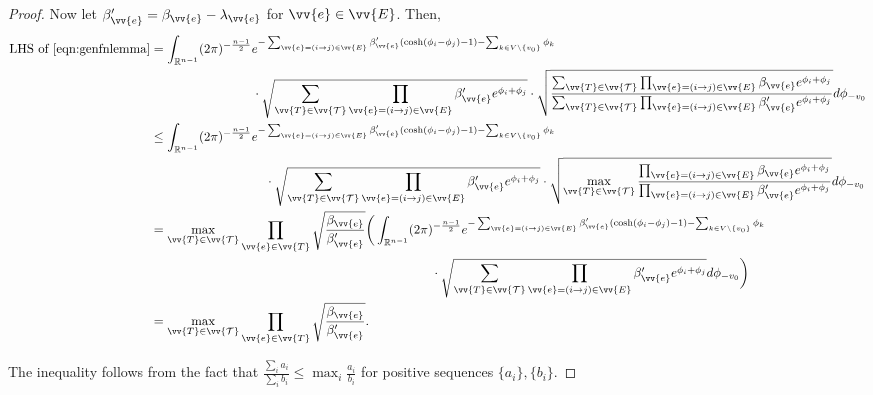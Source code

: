 \documentclass[a4paper, 11pt]{article}
\begin{document}
\begin{proof}
Now let \( \beta_{\vv{e}}' = \beta_{\vv{e}} - \lambda_{\vv{e}} \) for \( \vv{e} \in \vv{E} \). Then,
\begin{equation*}
\begin{aligned}
\text{LHS of \cref{eqn:genfnlemma}}
&= \int_{\mathbb{R}^{n-1}} (2\pi)^{-\frac{n-1}{2}} e^{-\sum_{\vv{e}=(i\to j)\in \vv{E}} \beta_{\vv{e}}' (\cosh(\phi_i - \phi_j) - 1) - \sum_{k \in V \setminus \{v_0\}} \phi_k} \\
& \hspace{8em} \cdot \sqrt{\sum_{\vv{T} \in \vv{\mathcal{T}}} \prod_{\vv{e}=(i\to j)\in \vv{E}} \beta_{\vv{e}}' e^{\phi_i + \phi_j}} \cdot \sqrt{\frac{\sum_{\vv{T} \in \vv{\mathcal{T}}} \prod_{\vv{e}=(i\to j)\in \vv{E}} \beta_{\vv{e}} e^{\phi_i + \phi_j}}{\sum_{\vv{T} \in \vv{\mathcal{T}}} \prod_{\vv{e}=(i\to j)\in \vv{E}} \beta_{\vv{e}}' e^{\phi_i + \phi_j}}} d\phi_{-v_0} \\
& \leq \int_{\mathbb{R}^{n-1}} (2\pi)^{-\frac{n-1}{2}} e^{-\sum_{\vv{e}=(i\to j)\in \vv{E}} \beta_{\vv{e}}' (\cosh(\phi_i - \phi_j) - 1) - \sum_{k \in V \setminus \{v_0\}} \phi_k} \\
& \hspace{9em} \cdot \sqrt{\sum_{\vv{T} \in \vv{\mathcal{T}}} \prod_{\vv{e}=(i\to j)\in \vv{E}} \beta_{\vv{e}}' e^{\phi_i + \phi_j}} \cdot \sqrt{\max_{\vv{T} \in \vv{\mathcal{T}}}\frac{ \prod_{\vv{e}=(i\to j)\in \vv{E}} \beta_{\vv{e}} e^{\phi_i + \phi_j}}{ \prod_{\vv{e}=(i\to j)\in \vv{E}} \beta_{\vv{e}}' e^{\phi_i + \phi_j}}} d\phi_{-v_0}\\
& = \max_{\vv{T} \in \vv{\mathcal{T}}} \prod_{\vv{e} \in \vv{T}} \sqrt{\frac{\beta_{\vv{e}}}{\beta_{\vv{e}}'}} \bigg(\int_{\mathbb{R}^{n-1}} (2\pi)^{-\frac{n-1}{2}} e^{-\sum_{\vv{e}=(i\to j)\in \vv{E}} \beta_{\vv{e}}' (\cosh(\phi_i - \phi_j) - 1) - \sum_{k \in V \setminus \{v_0\}} \phi_k} \\
& \hspace{22em} \cdot \sqrt{\sum_{\vv{T} \in \vv{\mathcal{T}}} \prod_{\vv{e}=(i\to j)\in \vv{E}} \beta_{\vv{e}}' e^{\phi_i + \phi_j}} d\phi_{-v_0} \bigg)\\
&= \max_{\vv{T} \in \vv{\mathcal{T}}} \prod_{\vv{e} \in \vv{T}} \sqrt{\frac{\beta_{\vv{e}}}{\beta_{\vv{e}}'}}.
\end{aligned}
\end{equation*}

The inequality follows from the fact that $\frac{\sum_i a_i}{\sum_i b_i} \leq \max_i \frac{a_i}{b_i}$ for positive sequences \( \{a_i\}, \{b_i\} \).
\end{proof}
\end{document}
